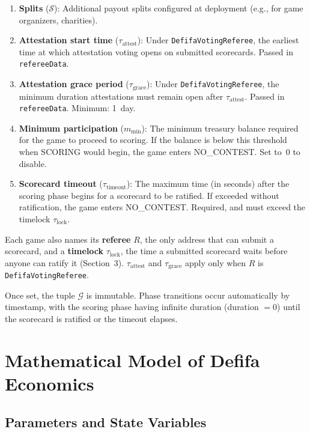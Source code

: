 \documentclass[11pt,a4paper]{article}
\begin{document}
\begin{enumerate}[nosep]
    \item \textbf{Splits} ($\mathcal{S}$): Additional payout splits configured at deployment (e.g., for game organizers, charities).

    \item \textbf{Attestation start time} ($\tau_{\text{attest}}$): Under \texttt{DefifaVotingReferee}, the earliest time at which attestation voting opens on submitted scorecards. Passed in \texttt{refereeData}.

    \item \textbf{Attestation grace period} ($\tau_{\text{grace}}$): Under \texttt{DefifaVotingReferee}, the minimum duration attestations must remain open after $\tau_{\text{attest}}$. Passed in \texttt{refereeData}. Minimum: 1~day.

    \item \textbf{Minimum participation} ($m_{\text{min}}$): The minimum treasury balance required for the game to proceed to scoring. If the balance is below this threshold when SCORING would begin, the game enters NO\_CONTEST. Set to~0 to disable.

    \item \textbf{Scorecard timeout} ($\tau_{\text{timeout}}$): The maximum time (in seconds) after the scoring phase begins for a scorecard to be ratified. If exceeded without ratification, the game enters NO\_CONTEST. Required, and must exceed the timelock $\tau_{\text{lock}}$.
\end{enumerate}

Each game also names its \textbf{referee} $R$, the only address that can submit a scorecard, and a \textbf{timelock} $\tau_{\text{lock}}$, the time a submitted scorecard waits before anyone can ratify it (Section~3). $\tau_{\text{attest}}$ and $\tau_{\text{grace}}$ apply only when $R$ is \texttt{DefifaVotingReferee}.

Once set, the tuple $\mathcal{G}$ is immutable. Phase transitions occur automatically by timestamp, with the scoring phase having infinite duration (duration $= 0$) until the scorecard is ratified or the timeout elapses.

\section{Mathematical Model of Defifa Economics}

\subsection{Parameters and State Variables}
\end{document}
